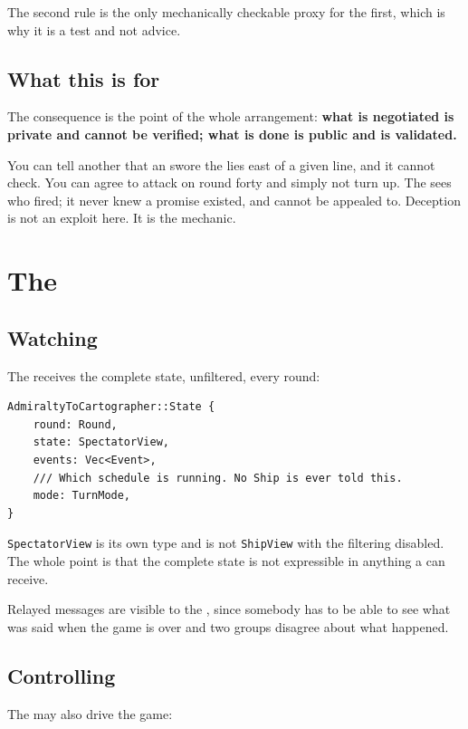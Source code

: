 \documentclass{article}
\begin{document}
The second rule is the only mechanically checkable proxy for the first, which is why it is a test
and not advice.

\subsection{What this is for}

The consequence is the point of the whole arrangement: \textbf{what is negotiated is private and
cannot be verified; what is done is public and is validated.}

You can tell another \ship{} that an \island{} swore the \treasure{} lies east of a given line, and
it cannot check. You can agree to attack on round forty and simply not turn up. The \admiralty{}
sees who fired; it never knew a promise existed, and cannot be appealed to. Deception is not an
exploit here. It is the mechanic.

\newpage
\section{The \cartographer}
\label{proto:cartographer}

\subsection{Watching}

The \cartographer{} receives the complete state, unfiltered, every round:

\begin{lstlisting}
AdmiraltyToCartographer::State {
    round: Round,
    state: SpectatorView,
    events: Vec<Event>,
    /// Which schedule is running. No Ship is ever told this.
    mode: TurnMode,
}
\end{lstlisting}

\texttt{SpectatorView} is its own type and is not \texttt{ShipView} with the filtering disabled.
The whole point is that the complete state is not expressible in anything a \ship{} can receive.

Relayed messages are visible to the \cartographer, since somebody has to be able to see what was
said when the game is over and two groups disagree about what happened.

\subsection{Controlling}

The \cartographer{} may also drive the game:
\end{document}
